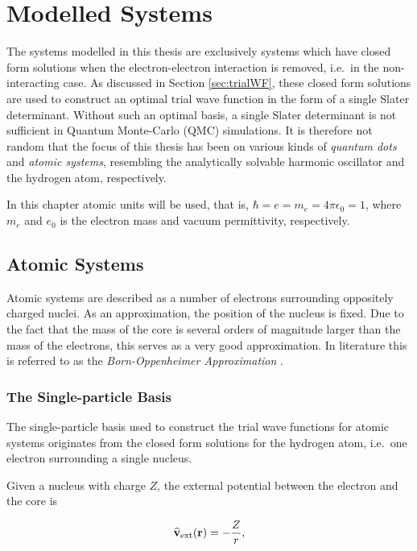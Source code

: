 \chapter{Modelled Systems}
\label{ch:modelledSystems}

The systems modelled in this thesis are exclusively systems which have closed form solutions when the electron-electron interaction is removed, i.e.~in the non-interacting case. As discussed in Section \ref{sec:trialWF}, these closed form solutions are used to construct an optimal trial wave function in the form of a single Slater determinant. Without such an optimal basis, a single Slater determinant is not sufficient in Quantum Monte-Carlo (QMC) simulations. It is therefore not random that the focus of this thesis has been on various kinds of \textit{quantum dots} and \textit{atomic systems}, resembling the analytically solvable harmonic oscillator and the hydrogen atom, respectively.

In this chapter atomic units will be used, that is, $\hbar=e=m_e=4\pi\epsilon_0 = 1$, where $m_e$ and $e_0$ is the electron mass and vacuum permittivity, respectively.

\section{Atomic Systems}
\label{sec:modelAtoms}

Atomic systems are described as a number of electrons surrounding oppositely charged nuclei. As an approximation, the position of the nucleus is fixed. Due to the fact that the mass of the core is several orders of magnitude larger than the mass of the electrons, this serves as a very good approximation. In literature this is referred to as the \textit{Born-Oppenheimer Approximation} \cite{Sakurai:94}.

\subsection{The Single-particle Basis}

The single-particle basis used to construct the trial wave functions for atomic systems originates from the closed form solutions for the hydrogen atom, i.e.~one electron surrounding a single nucleus.

Given a nucleus with charge $Z$, the external potential between the electron and the core is

\begin{equation}
 {\bf\widehat{v}}_\mathrm{ext}(\mathbf{r}) = -\frac{Z}{r}, \label{eq:v0hydro}
\end{equation}

